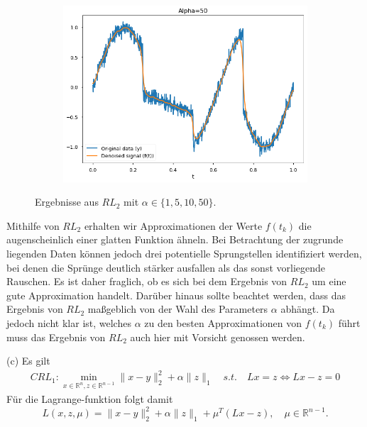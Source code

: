 \documentclass[ngerman, a4paper,12pt]{article}
\begin{document}
\begin{figure}[h]
\begin{subfigure}[b]{0.45\textwidth}
		\label{2a10}
	\end{subfigure}
	\begin{subfigure}[b]{0.45\textwidth}
		\includegraphics[width=1\columnwidth]{Images/2a50.png}
		\label{2a50}
	\end{subfigure}
	\caption{Ergebnisse aus $RL_2$ mit $\alpha \in \{1, 5, 10, 50\}$.}
	\vspace{-20pt}
\end{figure}
Mithilfe von $RL_2$ erhalten wir Approximationen der Werte $f(t_k)$ die augenscheinlich einer glatten Funktion ähneln. Bei Betrachtung der zugrunde liegenden Daten können jedoch drei potentielle Sprungstellen identifiziert werden, bei denen die Sprünge deutlich stärker ausfallen als das sonst vorliegende Rauschen. Es ist daher fraglich, ob es sich bei dem Ergebnis von $RL_2$ um eine gute Approximation handelt. Darüber hinaus sollte beachtet werden, dass das Ergebnis von $RL_2$ maßgeblich von der Wahl des Parameters $\alpha$ abhängt. Da jedoch nicht klar ist, welches $\alpha$ zu den besten Approximationen von $f(t_k)$ führt muss das Ergebnis von $RL_2$ auch hier mit Vorsicht genossen werden.
\par
(c) Es gilt
\begin{equation*}
	\begin{split}
	CRL_1: \min_{x\in\mathbb R^n,z \in \mathbb{R}^{n-1}}\|x-y\|_2^2+\alpha\|z\|_1 \quad s.t. \quad Lx = z \Leftrightarrow Lx - z=0
	\end{split}
\end{equation*}
Für die Lagrange-funktion folgt damit
\begin{equation}
\label{eq:lagrange}
L(x,z,\mu)=\|x-y\|_2^2+\alpha \|z\|_1+\mu^T(Lx - z), \quad \mu \in \mathbb{R}^{n-1}.
\end{equation}
\end{document}
